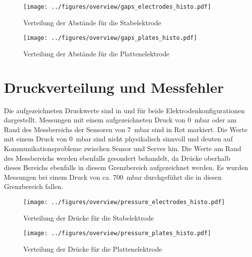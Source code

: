\begin{figure}[H]
    \centering
    \begin{minipage}[t]{0.47\textwidth}
        \centering
        \texttt{[image: ../figures/overview/gaps\_electrodes\_histo.pdf]}
        \caption{Verteilung der Abstände für die Stabelektrode}
        \label{fig:histogram-gap-stab}
    \end{minipage}
    \hfill
    \begin{minipage}[t]{0.47\textwidth}
        \centering
        \texttt{[image: ../figures/overview/gaps\_plates\_histo.pdf]}
        \caption{Verteilung der Abstände für die Plattenelektrode}
        \label{fig:histogram-gap-platte}
    \end{minipage}
\end{figure}

\section{Druckverteilung und Messfehler}
Die aufgezeichneten Druckwerte sind in  und  für beide Elektrodenkonfigurationen dargestellt. Messungen mit einem aufgezeichneten Druck von \SI{0}{\milli\bar} oder am Rand des Messbereichs der Sensoren von \SI{7}{\milli\bar} sind in Rot markiert. Die Werte mit einem Druck von \SI{0}{\milli\bar} sind nicht physikalisch sinnvoll und deuten auf Kommunikationsprobleme zwischen Sensor und Server hin. Die Werte am Rand des Messbereichs werden ebenfalls gesondert behandelt, da Drücke oberhalb dieses Bereichs ebenfalls in diesem Grenzbereich aufgezeichnet werden. Es wurden Messungen bei einem Druck von ca. \SI{700}{\milli\bar} durchgeführt die in diesen Grenzbereich fallen.
\begin{figure}[H]
    \centering
    \begin{minipage}[t]{0.47\textwidth}
        \centering
        \texttt{[image: ../figures/overview/pressure\_electrodes\_histo.pdf]}
        \caption{Verteilung der Drücke für die Stabelektrode}
        \label{fig:histogram-pressure-stab}
    \end{minipage}
    \hfill
    \begin{minipage}[t]{0.47\textwidth}
        \centering
        \texttt{[image: ../figures/overview/pressure\_plates\_histo.pdf]}
        \caption{Verteilung der Drücke für die Plattenelektrode}
        \label{fig:histogram-pressure-platte}
    \end{minipage}
\end{figure}

